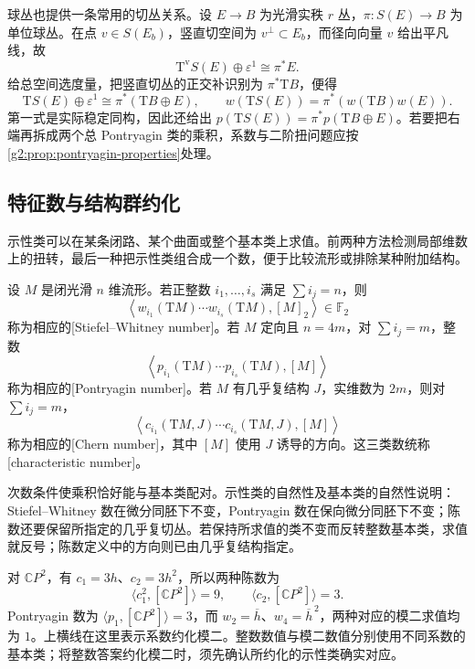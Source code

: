 球丛也提供一条常用的切丛关系。设 \(E\to B\) 为光滑实秩 \(r\) 丛，\(\pi:S(E)\to B\) 为单位球丛。在点 \(v\in S(E_b)\)，竖直切空间为 \(v^\perp\subset E_b\)，而径向向量 \(v\) 给出平凡线，故
\[
	\mathrm T^{\mathrm v}S(E)\oplus\varepsilon^1\cong\pi^*E.
\]
给总空间选度量，把竖直切丛的正交补识别为 \(\pi^*\mathrm TB\)，便得
\begin{equation}\label{g2:eq:sphere-bundle-stable-tangent}
	\mathrm TS(E)\oplus\varepsilon^1\cong\pi^*(\mathrm TB\oplus E),
	\qquad w(\mathrm TS(E))=\pi^*(w(\mathrm TB)w(E)).
\end{equation}
第一式是实际稳定同构，因此还给出 \(p(\mathrm TS(E))=\pi^*p(\mathrm TB\oplus E)\)。若要把右端再拆成两个总 Pontryagin 类的乘积，系数与二阶扭问题应按\cref{g2:prop:pontryagin-properties}处理。

\subsection{特征数与结构群约化}
\label{g2:subsec:2104:03}
示性类可以在某条闭路、某个曲面或整个基本类上求值。前两种方法检测局部维数上的扭转，最后一种把示性类组合成一个数，便于比较流形或排除某种附加结构。

\begin{definition}\label{g2:def:characteristic-numbers}
	设 \(M\) 是闭光滑 \(n\) 维流形。若正整数 \(i_1,\ldots,i_s\) 满足 \(\sum i_j=n\)，则
	\[
		\left\langle w_{i_1}(\mathrm TM)\cdots w_{i_s}(\mathrm TM),[M]_2\right\rangle\in\mathbb F_2
	\]
	称为相应的[Stiefel--Whitney number]。若 \(M\) 定向且 \(n=4m\)，对 \(\sum i_j=m\)，整数
	\[
		\left\langle p_{i_1}(\mathrm TM)\cdots p_{i_s}(\mathrm TM),[M]\right\rangle
	\]
	称为相应的[Pontryagin number]。若 \(M\) 有几乎复结构 \(J\)，实维数为 \(2m\)，则对 \(\sum i_j=m\)，
	\[
		\left\langle c_{i_1}(\mathrm TM,J)\cdots c_{i_s}(\mathrm TM,J),[M]\right\rangle
	\]
	称为相应的[Chern number]，其中 \([M]\) 使用 \(J\) 诱导的方向。这三类数统称[characteristic number]。
\end{definition}

次数条件使乘积恰好能与基本类配对。示性类的自然性及基本类的自然性说明：Stiefel--Whitney 数在微分同胚下不变，Pontryagin 数在保向微分同胚下不变；陈数还要保留所指定的几乎复切丛。若保持所求值的类不变而反转整数基本类，求值就反号；陈数定义中的方向则已由几乎复结构指定。

\begin{example}\label{g2:exm:chern-numbers-cp-two}
	对 \(\mathbb CP^2\)，有 \(c_1=3h\)、\(c_2=3h^2\)，所以两种陈数为
	\[
		\langle c_1^2,[\mathbb CP^2]\rangle=9,\qquad
		\langle c_2,[\mathbb CP^2]\rangle=3.
	\]
	Pontryagin 数为 \(\langle p_1,[\mathbb CP^2]\rangle=3\)，而 \(w_2=\overline h\)、\(w_4=\overline h^{\,2}\)，两种对应的模二求值均为 \(1\)。上横线在这里表示系数约化模二。整数数值与模二数值分别使用不同系数的基本类；将整数答案约化模二时，须先确认所约化的示性类确实对应。
\end{example}

